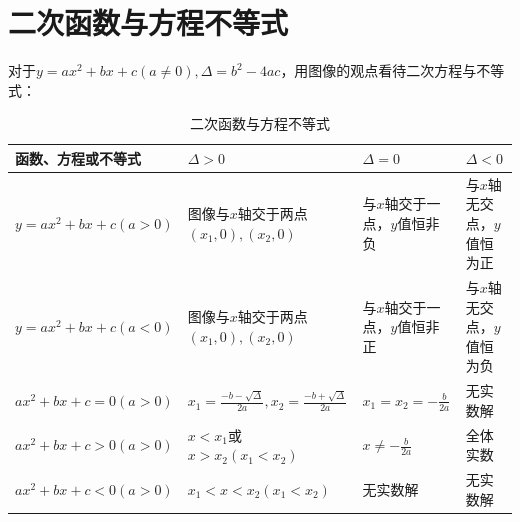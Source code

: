 \documentclass{ecnuthesis}
\begin{document}
\section{二次函数与方程不等式}
\begin{knowledge}
    对于$y=ax^2+bx+c(a\ne 0),\Delta = b^2-4ac$，用图像的观点看待二次方程与不等式：
\end{knowledge}
\begin{table}[H]
\centering
\caption{二次函数与方程不等式}
\begin{tabular}{l|p{5cm}|p{3cm}|p{2.8cm}}
\hline
\hline
函数、方程或不等式 & $\Delta > 0 $ & $\Delta = 0 $ & $\Delta < 0 $ \\
\hline
$y=ax^2+bx+c(a>0)$ & 图像与$x$轴交于两点$(x_1,0),(x_2,0)$ & 与$x$轴交于一点，$y$值恒非负 & 与$x$轴无交点，$y$值恒为正 \\
$y=ax^2+bx+c(a<0)$ & 图像与$x$轴交于两点$(x_1,0),(x_2,0)$ & 与$x$轴交于一点，$y$值恒非正 & 与$x$轴无交点，$y$值恒为负 \\
$ax^2+bx+c=0(a>0)$ & $x_1=\frac{-b-\sqrt\Delta}{2a},x_2=\frac{-b+\sqrt\Delta}{2a}$ & $x_1=x_2=-\frac{b}{2a}$ & 无实数解 \\
$ax^2+bx+c>0(a>0)$ & $x<x_1$或$x>x_2(x_1<x_2)$ & $x \ne -\frac{b}{2a}$ & 全体实数 \\
$ax^2+bx+c<0(a>0)$ & $x_1<x<x_2(x_1<x_2)$ & 无实数解 & 无实数解 \\
\hline
\hline
\end{tabular}
\end{table}
\clearpage
\end{document}
